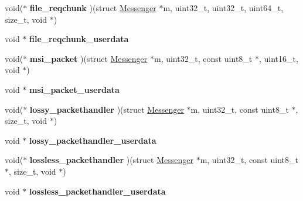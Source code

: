 \begin{DoxyCompactItemize}
\item 
\hypertarget{struct_messenger_a8e913b9866264d0e9518d54b08cc4eeb}{void($\ast$ {\bfseries file\+\_\+reqchunk} )(struct \hyperlink{struct_messenger}{Messenger} $\ast$m, uint32\+\_\+t, uint32\+\_\+t, uint64\+\_\+t, size\+\_\+t, void $\ast$)}\label{struct_messenger_a8e913b9866264d0e9518d54b08cc4eeb}

\item 
\hypertarget{struct_messenger_afab0bf4f4929791bf8cab5603f400391}{void $\ast$ {\bfseries file\+\_\+reqchunk\+\_\+userdata}}\label{struct_messenger_afab0bf4f4929791bf8cab5603f400391}

\item 
\hypertarget{struct_messenger_a94a1e6432d69be20e4da5e919f4c61e5}{void($\ast$ {\bfseries msi\+\_\+packet} )(struct \hyperlink{struct_messenger}{Messenger} $\ast$m, uint32\+\_\+t, const uint8\+\_\+t $\ast$, uint16\+\_\+t, void $\ast$)}\label{struct_messenger_a94a1e6432d69be20e4da5e919f4c61e5}

\item 
\hypertarget{struct_messenger_a1b0f16a3c32591e1bc33406459dfac29}{void $\ast$ {\bfseries msi\+\_\+packet\+\_\+userdata}}\label{struct_messenger_a1b0f16a3c32591e1bc33406459dfac29}

\item 
\hypertarget{struct_messenger_afba23a025d7275ca11e8f7d56386d3d1}{void($\ast$ {\bfseries lossy\+\_\+packethandler} )(struct \hyperlink{struct_messenger}{Messenger} $\ast$m, uint32\+\_\+t, const uint8\+\_\+t $\ast$, size\+\_\+t, void $\ast$)}\label{struct_messenger_afba23a025d7275ca11e8f7d56386d3d1}

\item 
\hypertarget{struct_messenger_a2b87de1f33a502c6dd105cd69a905c35}{void $\ast$ {\bfseries lossy\+\_\+packethandler\+\_\+userdata}}\label{struct_messenger_a2b87de1f33a502c6dd105cd69a905c35}

\item 
\hypertarget{struct_messenger_ade523661676bfd811bd8676c29600900}{void($\ast$ {\bfseries lossless\+\_\+packethandler} )(struct \hyperlink{struct_messenger}{Messenger} $\ast$m, uint32\+\_\+t, const uint8\+\_\+t $\ast$, size\+\_\+t, void $\ast$)}\label{struct_messenger_ade523661676bfd811bd8676c29600900}

\item 
\hypertarget{struct_messenger_aa46ae2a29721e8b27e0d4aac8b64b195}{void $\ast$ {\bfseries lossless\+\_\+packethandler\+\_\+userdata}}\label{struct_messenger_aa46ae2a29721e8b27e0d4aac8b64b195}


\end{DoxyCompactItemize}
